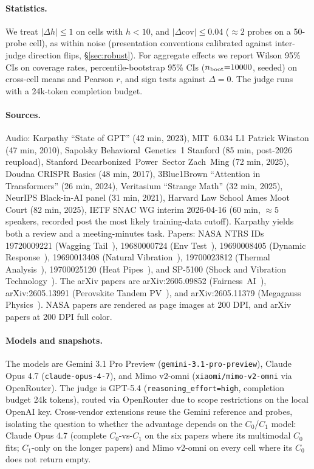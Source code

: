 \documentclass[11pt]{article}
\begin{document}
\paragraph{Statistics.} We treat $|\Delta h|\le 1$ on cells with $h<10$, and $|\Delta\mathrm{cov}|\le 0.04$ ($\approx 2$ probes on a 50-probe cell), as within noise (presentation conventions calibrated against inter-judge direction flips, \S\ref{sec:robust}). For aggregate effects we report Wilson 95\% CIs on coverage rates, percentile-bootstrap 95\% CIs ($n_{\rm boot}{=}10000$, seeded) on cross-cell means and Pearson $r$, and sign tests against $\Delta{=}0$. The judge runs with a 24k-token completion budget.

\paragraph{Sources.} Audio: Karpathy ``State of GPT'' (42 min, 2023), MIT~6.034 L1 Patrick Winston (47 min, 2010), Sapolsky Behavioral~Genetics~1 Stanford (85 min, post-2026 reupload), Stanford Decarbonized~Power~Sector Zach~Ming (72 min, 2025), Doudna CRISPR Basics (48 min, 2017), 3Blue1Brown ``Attention in Transformers'' (26 min, 2024), Veritasium ``Strange Math'' (32 min, 2025), NeurIPS Black-in-AI panel (31 min, 2021), Harvard Law School Ames Moot Court (82 min, 2025), IETF SNAC WG interim 2026-04-16 (60 min, $\approx 5$ speakers, recorded post the most likely training-data cutoff). Karpathy yields both a review and a meeting-minutes task. Papers: NASA NTRS IDs 19720009221 (Wagging Tail~\cite{nasa_waggingtail}), 19680000724 (Env Test~\cite{nasa_envtest}), 19690008405 (Dynamic Response~\cite{nasa_dynresp}), 19690013408 (Natural Vibration~\cite{nasa_naturalvib}), 19700023812 (Thermal Analysis~\cite{nasa_thermal}), 19700025120 (Heat Pipes~\cite{nasa_heatpipes}), and SP-5100 (Shock and Vibration Technology~\cite{nasa_sp5100}). The arXiv papers are arXiv:2605.09852 (Fairness~AI~\cite{arxiv_fairness}), arXiv:2605.13991 (Perovskite Tandem PV~\cite{arxiv_perovskite}), and arXiv:2605.11379 (Megagauss Physics~\cite{arxiv_megagauss}). NASA papers are rendered as page images at 200 DPI, and arXiv papers at 200 DPI full color.

\paragraph{Models and snapshots.} The models are Gemini 3.1 Pro Preview (\texttt{gemini-3.1-pro-preview}), Claude Opus 4.7 (\texttt{claude-opus-4-7}), and Mimo v2-omni (\texttt{xiaomi/mimo-v2-omni} via OpenRouter). The judge is GPT-5.4 (\texttt{reasoning\_effort=high}, completion budget 24k tokens), routed via OpenRouter due to scope restrictions on the local OpenAI key. Cross-vendor extensions reuse the Gemini reference and probes, isolating the question to whether the advantage depends on the $C_0$/$C_1$ model: Claude Opus 4.7 (complete $C_0$-vs-$C_1$ on the six papers where its multimodal $C_0$ fits; $C_1$-only on the longer papers) and Mimo v2-omni on every cell where its $C_0$ does not return empty.
\end{document}
